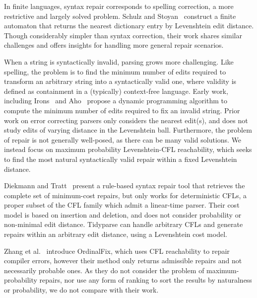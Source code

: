 \documentclass[sigplan,acmsmall,nonacm,screen]{acmart}\settopmatter{printfolios=false,printccs=false,printacmref=false}
\begin{document}
In finite languages, syntax repair corresponds to spelling correction, a more restrictive and largely solved problem. Schulz and Stoyan~\cite{schulz2002fast} construct a finite automaton that returns the nearest dictionary entry by Levenshtein edit distance. Though considerably simpler than syntax correction, their work shares similar challenges and offers insights for handling more general repair scenarios.

When a string is syntactically invalid, parsing grows more challenging. Like spelling, the problem is to find the minimum number of edits required to transform an arbitrary string into a syntactically valid one, where validity is defined as containment in a (typically) context-free language. Early work, including Irons~\cite{irons1963error} and Aho~\cite{aho1972minimum} propose a dynamic programming algorithm to compute the minimum number of edits required to fix an invalid string. Prior work on error correcting parsers only considers the nearest edit(s), and does not study edits of varying distance in the Levenshtein ball. Furthermore, the problem of repair is not generally well-posed, as there can be many valid solutions. We instead focus on maximum probability Levenshtein-CFL reachability, which seeks to find the most natural syntactically valid repair within a fixed Levenshtein distance.

Diekmann and Tratt~\cite{diekmann2018dont} present a rule-based syntax repair tool that retrieves the complete set of minimum-cost repairs, but only works for deterministic CFLs, a proper subset of the CFL family which admit a linear-time parser. Their cost model is based on insertion and deletion, and does not consider probability or non-minimal edit distance. Tidyparse can handle arbitrary CFLs and generate repairs within an arbitrary edit distance, using a Levenshtein cost model.

Zhang et al.~\cite{zhang2023ordinalfix} introduce OrdinalFix, which uses CFL reachability to repair compiler errors, however their method only returns admissible repairs and not necessarily probable ones. As they do not consider the problem of maximum-probability repairs, nor use any form of ranking to sort the results by naturalness or probability, we do not compare with their work.
\end{document}
